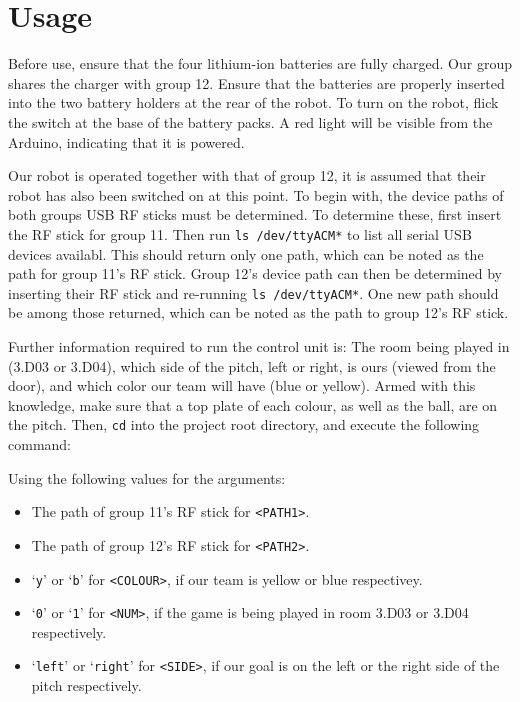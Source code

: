 \section{Usage}

Before use, ensure that the four lithium-ion batteries are fully charged. Our
group shares the charger with group 12. Ensure that the batteries are properly
inserted into the two battery holders at the rear of the robot. To turn on the
robot, flick the switch at the base of the battery packs. A red light will be
visible from the Arduino, indicating that it is powered.

Our robot is operated together with that of group 12, it is assumed that their
robot has also been switched on at this point. To begin with, the device paths
of both groups USB RF sticks must be determined. To determine these, first
insert the RF stick for group 11. Then run \texttt{ls /dev/ttyACM*} to list all
serial USB devices availabl. This should return only one path, which can be
noted as the path for group 11's RF stick. Group 12's device path can then be
determined by inserting their RF stick and re-running \texttt{ls /dev/ttyACM*}.
One new path should be among those returned, which can be noted as the path to
group 12's RF stick.

Further information required to run the control unit is: The room being played
in (3.D03 or 3.D04), which side of the pitch, left or right, is ours (viewed
from the door), and which color our team will have (blue or yellow). Armed with
this knowledge, make sure that a top plate of each colour, as well as the ball,
are on the pitch. Then, \texttt{cd} into the project root directory, and
execute the following command:


\noindent Using the following values for the arguments:

\begin{itemize}
    \item The path of group 11's RF stick for \texttt{<PATH1>}.
    \item The path of group 12's RF stick for \texttt{<PATH2>}.
    \item `\texttt{y}' or `\texttt{b}' for \texttt{<COLOUR>}, if our team is
        yellow or blue respectivey.
    \item `\texttt{0}' or `\texttt{1}' for \texttt{<NUM>}, if the game is being
        played in room 3.D03 or 3.D04 respectively.
    \item `\texttt{left}' or `\texttt{right}' for \texttt{<SIDE>}, if our goal
        is on the left or the right side of the pitch respectively.
\end{itemize}


